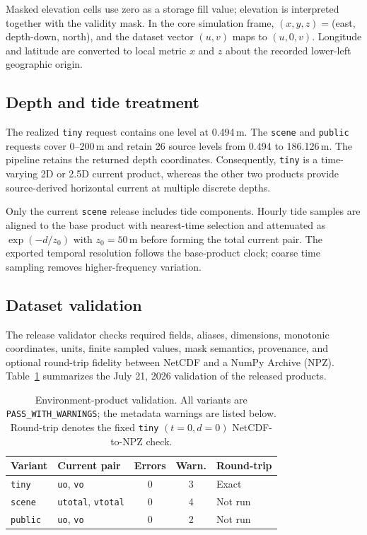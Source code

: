 Masked elevation cells use zero as a storage fill value; elevation is interpreted together with the validity mask. In the core simulation frame, $(x,y,z)=$(east, depth-down, north), and the dataset vector $(u,v)$ maps to $(u,0,v)$. Longitude and latitude are converted to local metric $x$ and $z$ about the recorded lower-left geographic origin.

\subsection{Depth and tide treatment}

The realized \texttt{tiny} request contains one level at 0.494\,m. The \texttt{scene} and \texttt{public} requests cover 0--200\,m and retain 26 source levels from 0.494 to 186.126\,m. The pipeline retains the returned depth coordinates. Consequently, \texttt{tiny} is a time-varying 2D or 2.5D current product, whereas the other two products provide source-derived horizontal current at multiple discrete depths.

Only the current \texttt{scene} release includes tide components. Hourly tide samples are aligned to the base product with nearest-time selection and attenuated as $\exp(-d/z_0)$ with $z_0=50$\,m before forming the total current pair. The exported temporal resolution follows the base-product clock; coarse time sampling removes higher-frequency variation.

\subsection{Dataset validation}

The release validator checks required fields, aliases, dimensions, monotonic coordinates, units, finite sampled values, mask semantics, provenance, and optional round-trip fidelity between NetCDF and a NumPy Archive (NPZ). Table~\ref{tab:app_validator} summarizes the July 21, 2026 validation of the released products.

\begin{table}[t]
\centering
\scriptsize
\setlength{\tabcolsep}{3pt}
\renewcommand{\arraystretch}{1.10}
\begin{tabularx}{\columnwidth}{l X c c l}
\toprule
\textbf{Variant} & \textbf{Current pair} & \textbf{Errors} & \textbf{Warn.} & \textbf{Round-trip} \\
\midrule
\texttt{tiny} & \texttt{uo}, \texttt{vo} & 0 & 3 & Exact \\
\texttt{scene} & \texttt{utotal}, \texttt{vtotal} & 0 & 4 & Not run \\
\texttt{public} & \texttt{uo}, \texttt{vo} & 0 & 2 & Not run \\
\bottomrule
\end{tabularx}
\caption{Environment-product validation. All variants are \texttt{PASS\_WITH\_WARNINGS}; the metadata warnings are listed below. Round-trip denotes the fixed \texttt{tiny} $(t=0,d=0)$ NetCDF-to-NPZ check.}
\label{tab:app_validator}
\end{table}

